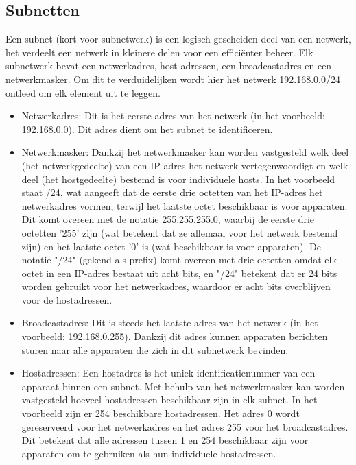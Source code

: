 \subsection{Subnetten}
Een subnet (kort voor subnetwerk) is een logisch gescheiden deel van een netwerk, het verdeelt een netwerk in kleinere delen voor een efficiënter beheer. Elk subnetwerk bevat een netwerkadres, host-adressen, een broadcastadres en een netwerkmasker. Om dit te verduidelijken wordt hier het netwerk 192.168.0.0/24 ontleed om elk element uit te leggen.

\begin{itemize}
    \item Netwerkadres: Dit is het eerste adres van het netwerk (in het voorbeeld: 192.168.0.0). Dit adres dient om het subnet te identificeren.
    \item Netwerkmasker: Dankzij het netwerkmasker kan worden vastgesteld welk deel (het netwerkgedeelte) van een IP-adres het netwerk vertegenwoordigt en welk deel (het hostgedeelte) bestemd is voor individuele hosts. In het voorbeeld staat /24, wat aangeeft dat de eerste drie octetten van het IP-adres het netwerkadres vormen, terwijl het laatste octet beschikbaar is voor apparaten. Dit komt overeen met de notatie 255.255.255.0, waarbij de eerste drie octetten '255' zijn (wat betekent dat ze allemaal voor het netwerk bestemd zijn) en het laatste octet '0' is (wat beschikbaar is voor apparaten). De notatie "/24" (gekend als prefix) komt overeen met drie octetten omdat elk octet in een IP-adres bestaat uit acht bits, en "/24" betekent dat er 24 bits worden gebruikt voor het netwerkadres, waardoor er acht bits overblijven voor de hostadressen.      
    \item Broadcastadres: Dit is steeds het laatste adres van het netwerk (in het voorbeeld: 192.168.0.255). Dankzij dit adres kunnen apparaten berichten sturen naar alle apparaten die zich in dit subnetwerk bevinden.
    \item Hostadressen: Een hostadres is het uniek identificatienummer van een apparaat binnen een subnet. Met behulp van het netwerkmasker kan worden vastgesteld hoeveel hostadressen beschikbaar zijn in elk subnet. In het voorbeeld zijn er 254 beschikbare hostadressen. Het adres 0 wordt gereserveerd voor het netwerkadres en het adres 255 voor het broadcastadres. Dit betekent dat alle adressen tussen 1 en 254 beschikbaar zijn voor apparaten om te gebruiken als hun individuele hostadressen.
\end{itemize}


